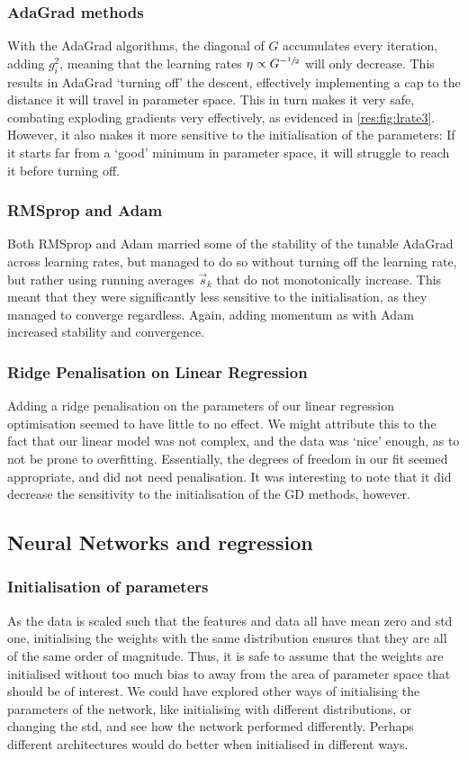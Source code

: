     \subsubsection{AdaGrad methods}
        With the AdaGrad algorithms, the diagonal of $G$ accumulates every iteration, adding $g_i^2$, meaning that the learning rates $\eta \propto G^{-\sfrac{1}{2}}$ will only decrease. This results in AdaGrad `turning off' the descent, effectively implementing a cap to the distance it will travel in parameter space. This in turn makes it very safe, combating exploding gradients very effectively, as evidenced in \cref{res:fig:lrate3}. However, it also makes it more sensitive to the initialisation of the parameters: If it starts far from a `good' minimum in parameter space, it will struggle to reach it before turning off.

    \subsubsection{RMSprop and Adam}
        Both RMSprop and Adam married some of the stability of the tunable AdaGrad across learning rates, but managed to do so without turning off the learning rate, but rather using running averages $\vec{s}_k$ that do not monotonically increase. This meant that they were significantly less sensitive to the initialisation, as they managed to converge regardless. Again, adding momentum as with Adam increased stability and convergence. 

        
        \subsubsection{Ridge Penalisation on Linear Regression}
        Adding a ridge penalisation on the parameters of our linear regression optimisation seemed to have little to no effect. We might attribute this to the fact that our linear model was not complex, and the data was `nice' enough, as to not be prone to overfitting. Essentially, the degrees of freedom in our fit seemed appropriate, and did not need penalisation. It was interesting to note that it did decrease the sensitivity to the initialisation of the GD methods, however.

\subsection{Neural Networks and regression}
    \subsubsection{Initialisation of parameters}
        As the data is scaled such that the features and data all have mean zero and std one, initialising the weights with the same distribution ensures that they are all of the same order of magnitude. Thus, it is safe to assume that the weights are initialised without too much bias to away from the area of parameter space that should be of interest. We could have explored other ways of initialising the parameters of the network, like initialising with different distributions, or changing the std, and see how the network performed differently. Perhaps different architectures would do better when initialised in different ways. 


